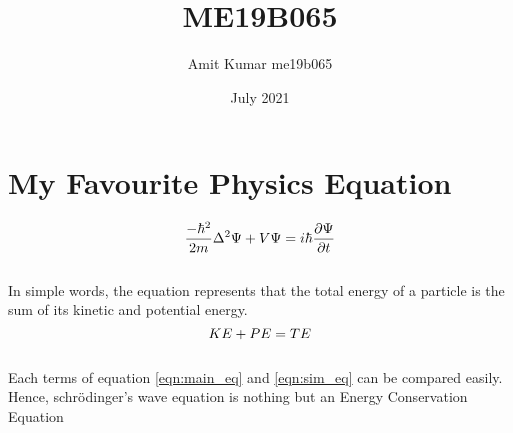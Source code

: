 \documentclass{article}
\title{ME19B065}
\author{Amit Kumar me19b065}
\date{July 2021}
\begin{document}
\maketitle

\section{My Favourite Physics Equation}
\hspace{6mm}
\begin{equation}
\label{eqn:main_eq}
\Large
      \frac{-\hbar^2}{2m}\Delta^2{\Psi} + V\Psi = i\hbar{\frac{\partial \Psi}{\partial t}}
\end{equation}
\\
In simple words, the equation represents that the total energy of a particle is the sum of its kinetic and potential energy. \\
\begin{equation}
\label{eqn:sim_eq}
\Large
    KE+PE=TE
\end{equation}
\\
Each terms of equation \ref{eqn:main_eq} and \ref{eqn:sim_eq} can be compared easily. Hence, schrödinger's wave equation is nothing but an Energy Conservation Equation
\end{document}
